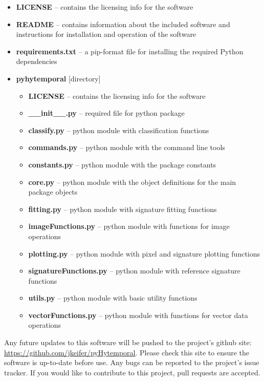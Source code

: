 \begin{Spacing}{1.2}
\begin{itemize}
  \item \textbf{LICENSE} -- contains the licensing info for the software
  \item \textbf{README} -- contains information about the included software and instructions for installation and operation of the software
  \item \textbf{requirements.txt} -- a pip-format file for installing the required Python dependencies
  \item \textbf{pyhytemporal} [directory]
  \begin{itemize}
    \item \textbf{LICENSE} -- contains the licensing info for the software
    \item \textbf{\_\_init\_\_.py} -- required file for python package
    \item \textbf{classify.py} -- python module with classification functions
    \item \textbf{commands.py} -- python module with the command line tools
    \item \textbf{constants.py} -- python module with the package constants
    \item \textbf{core.py} -- python module with the object definitions for the main package objects
    \item \textbf{fitting.py} -- python module with signature fitting functions
    \item \textbf{imageFunctions.py} -- python module with functions for image operations
    \item \textbf{plotting.py} -- python module with pixel and signature plotting functions
    \item \textbf{signatureFunctions.py} -- python module with reference signature functions
    \item \textbf{utils.py} -- python module with basic utility functions
    \item \textbf{vectorFunctions.py} -- python module with functions for vector data operations
  \end{itemize}
\end{itemize}
\end{Spacing}

Any future updates to this software will be pushed to the project's github site: \url{https://github.com/jkeifer/pyHytemporal}. Please check this site to ensure the software is up-to-date before use. Any bugs can be reported to the project's issue tracker. If you would like to contribute to this project, pull requests are accepted.